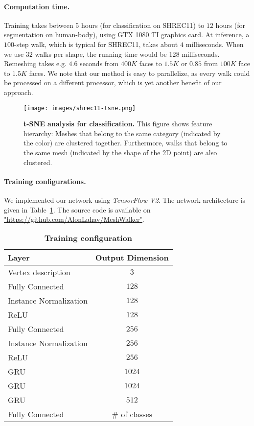 \documentclass[acmtog]{acmart}
\begin{document}
\paragraph{Computation time.}
Training takes between $5$ hours (for classification on SHREC11) to $12$ hours (for segmentation on human-body), using GTX 1080 TI graphics card.
At inference, a $100$-step walk, which is typical for  SHREC11, takes about $4$ milliseconds.
When we use $32$ walks per shape, the running time would be $128$ milliseconds. 
Remeshing takes e.g. $4.6$ seconds from $400K$ faces to $1.5K$ or $0.85$ from $100K$ face  to $1.5K$ faces.
We note that our method is easy to parallelize, as every walk could be processed on a different processor, which is yet another benefit of our approach.


\begin{figure}[tb] 
\centering 
\texttt{[image: images/shrec11-tsne.png]} 
\caption{
{\bf t-SNE analysis for classification.}
This figure shows feature hierarchy:
Meshes that belong to the same category (indicated by the color) are clustered together.
Furthermore, walks that belong to the same mesh  (indicated by the shape of the 2D point) are also clustered.
}
\label{fig:t-sne_shrec} 
\end{figure}


\paragraph{Training configurations.}
We implemented our network using {\em TensorFlow V2}. 
The network architecture is given in Table~\ref{tbl:configuration}.
The source code is available on
\url{"https://github.com/AlonLahav/MeshWalker"}.

\begin{table}[htb]\caption{{\bf Training configuration}}
\begin{center}
 \begin{tabular}{||l c||} 
 \hline
 Layer & Output Dimension \\ [0.5ex] 
 \hline\hline\hline
 Vertex description & $3$  \\ 
 Fully Connected & $128$  \\ 
 Instance Normalization & $128$ \\ 
 ReLU & $128$ \\
 Fully Connected & $256$  \\ 
 Instance Normalization & $256$ \\ 
 ReLU & $256$ \\
 GRU & $1024$ \\
 GRU & $1024$ \\
 GRU & $512$ \\
 Fully Connected & \# of classes  \\ 
 \hline
\end{tabular}
\label{tbl:configuration}
\end{center}
\end{table}
\end{document}
